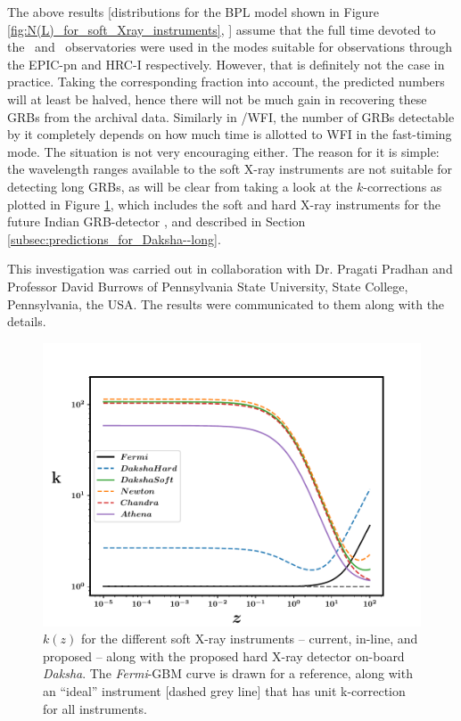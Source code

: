 The above results [distributions for the BPL model shown in Figure \ref{fig:N(L)_for_soft_Xray_instruments}, \eL] assume that the full time devoted to the \X\, and \C\, observatories were used in the modes suitable for observations through the EPIC-pn and HRC-I respectively. However, that is definitely not the case in practice. Taking the corresponding fraction into account, the predicted numbers will at least be halved, hence there will not be much gain in recovering these GRBs from the archival data. Similarly in \A /WFI, the number of GRBs detectable by it completely depends on how much time is allotted to WFI in the fast-timing mode. The situation is not very encouraging either. The reason for it is simple: the wavelength ranges available to the soft X-ray instruments are not suitable for detecting long GRBs, as will be clear from taking a look at the $k$-corrections as plotted in Figure \ref{fig:k_corrections_for_long_GRBs}, which includes the soft and hard X-ray instruments for the future Indian GRB-detector \D, and described in Section \ref{subsec:predictions_for_Daksha--long}.

\begin{checkit}
This investigation was carried out in collaboration with Dr. Pragati Pradhan and Professor David Burrows of Pennsylvania State University, State College, Pennsylvania, the USA. The results were communicated to them along with the details. %
\end{checkit}

\begin{figure}
\begin{center}
\includegraphics[scale=0.5]{k_correction--long--soft_Xray_instruments_and_Dakshas}
\caption[$k(z)$ of several GRB detectors]{$k(z)$ for the different soft X-ray instruments -- current, in-line, and proposed -- along with the proposed hard X-ray detector on-board \emph{Daksha}. The \emph{Fermi}-GBM curve is drawn for a reference, along with an ``ideal'' instrument [dashed grey line] that has unit k-correction for all instruments.}
\label{fig:k_corrections_for_long_GRBs}
\end{center}
\end{figure}


